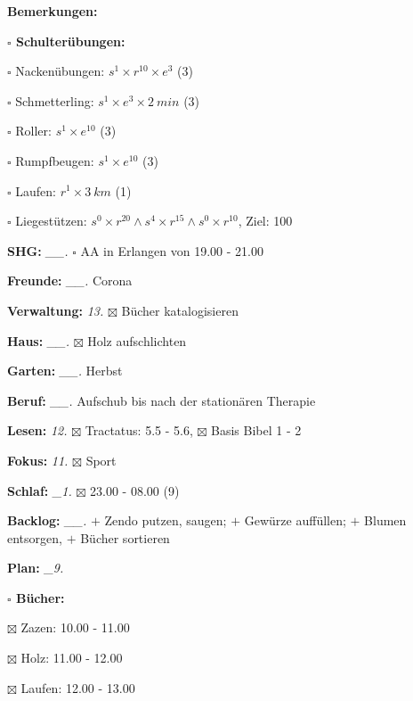 \documentclass[10pt,a4paper]{article}
\newcommand\prop[1] {{\color {alizarin} {\bf #1}}}             %
\newcommand\mand[1] {{\color {burntorange} {\bf #1}}}          %
\newcommand\topspace{\vskip -15pt \hskip 20pt}
\newcommand\bottomspace{\vskip 4pt}
\newcommand\n[1] { {\sl #1.} \hskip 5pt }
\begin{document}
\begin{mdframed}[style=daystyle]
\begin{labeling}{{\mand {Bemerkungen:}}}
\begin{minipage}{0.75\textwidth}
\begin{labeling}{\prop {$\square$ {Schulterübungen:}}}
      \item[$\square$ Nackenübungen:]   $s^1 \times r^{10} \times e^3$ (3)
      \item[$\square$ Schmetterling:]   $s^1 \times e^3 \times 2\ min$ (3)
      \item[$\square$ Roller:]          $s^1 \times e^{10}$ (3)
      \item[$\square$ Rumpfbeugen:]     $s^1 \times e^{10}$ (3)
      \item[$\square$ Laufen:]          $r^1 \times 3\ km$ (1)
      \item[$\square$ Liegestützen:]    $s^0 \times r^{20} \land s^4 \times r^{15} \land s^0 \times r^{10}$, Ziel: 100
      \end{labeling}
    \end{minipage}
    \bottomspace        
  \item[{\mand {SHG:}}]          \n{\_\_} $\square$ AA in Erlangen von 19.00 - 21.00
  \item[{\mand {Freunde:}}]      \n{\_\_} Corona
  \item[{\mand {Verwaltung:}}]     \n{13} $\boxtimes$ Bücher katalogisieren
  \item[{\mand {Haus:}}]         \n{\_\_} $\boxtimes$ Holz aufschlichten
  \item[{\mand {Garten:}}]       \n{\_\_} Herbst
  \item[{\mand {Beruf:}}]        \n{\_\_} Aufschub bis nach der stationären Therapie
  \item[{\mand {Lesen:}}]          \n{12} $\boxtimes$ Tractatus: 5.5 - 5.6, $\boxtimes$ Basis Bibel 1 - 2
  \item[{\mand {Fokus:}}]          \n{11} $\boxtimes$ Sport
  \item[{\mand {Schlaf:}}]        \n{\_1} $\boxtimes$ 23.00 - 08.00 (9)
  \item[{\mand {Backlog:}}]      \n{\_\_} 
    $+$ Zendo putzen, saugen; $+$ Gewürze auffüllen; $+$ Blumen entsorgen, $+$ Bücher sortieren
  \item[{\mand {Plan:}}]          \n{\_9}
    \topspace
    \begin{minipage}{0.75\textwidth}  
      \begin{labeling}{\prop {$\square$ { Bücher:}}} 
        \setlength\itemsep{-3pt}
      \item[$\boxtimes$ Zazen:]   10.00 - 11.00
      \item[$\boxtimes$ Holz:]    11.00 - 12.00        
      \item[$\boxtimes$ Laufen:]  12.00 - 13.00        

\end{labeling}
\end{minipage}
\end{labeling}
\end{mdframed}
\end{document}
